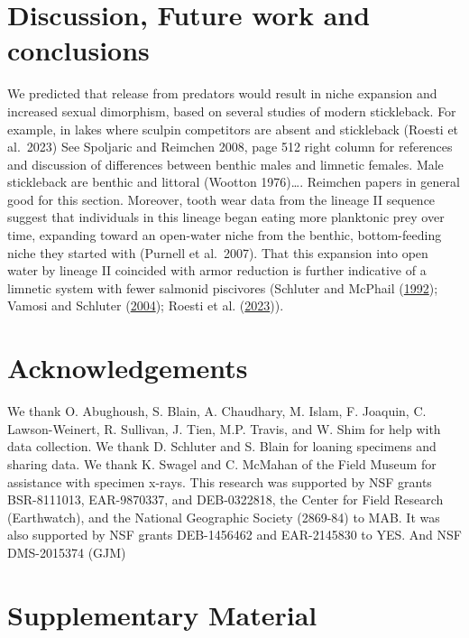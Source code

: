\documentclass[
  12pt,
]{article}
\begin{document}
\hypertarget{sec:conclusions}{%
\section{Discussion, Future work and
conclusions}\label{sec:conclusions}}

We predicted that release from predators would result in niche expansion
and increased sexual dimorphism, based on several studies of modern
stickleback. For example, in lakes where sculpin competitors are absent
and stickleback (Roesti et al.~2023) See Spoljaric and Reimchen 2008,
page 512 right column for references and discussion of differences
between benthic males and limnetic females. Male stickleback are benthic
and littoral (Wootton 1976)\ldots. Reimchen papers in general good for
this section. Moreover, tooth wear data from the lineage II sequence
suggest that individuals in this lineage began eating more planktonic
prey over time, expanding toward an open-water niche from the benthic,
bottom-feeding niche they started with (Purnell et al.~2007). That this
expansion into open water by lineage II coincided with armor reduction
is further indicative of a limnetic system with fewer salmonid
piscivores (Schluter and McPhail
(\protect\hyperlink{ref-SchluterandMcPhail1992}{1992}); Vamosi and
Schluter (\protect\hyperlink{ref-VamosiandSchluter2004}{2004}); Roesti
et al. (\protect\hyperlink{ref-Roestietal2023}{2023})).

\hypertarget{acknowledgements}{%
\section*{Acknowledgements}\label{acknowledgements}}

We thank O. Abughoush, S. Blain, A. Chaudhary, M. Islam, F. Joaquin, C.
Lawson-Weinert, R. Sullivan, J. Tien, M.P. Travis, and W. Shim for help
with data collection. We thank D. Schluter and S. Blain for loaning
specimens and sharing data. We thank K. Swagel and C. McMahan of the
Field Museum for assistance with specimen x-rays. This research was
supported by NSF grants BSR-8111013, EAR-9870337, and DEB-0322818, the
Center for Field Research (Earthwatch), and the National Geographic
Society (2869-84) to MAB. It was also supported by NSF grants
DEB-1456462 and EAR-2145830 to YES. And NSF DMS-2015374 (GJM)

\hypertarget{supplementary-material}{%
\section*{Supplementary Material}\label{supplementary-material}}
\end{document}
